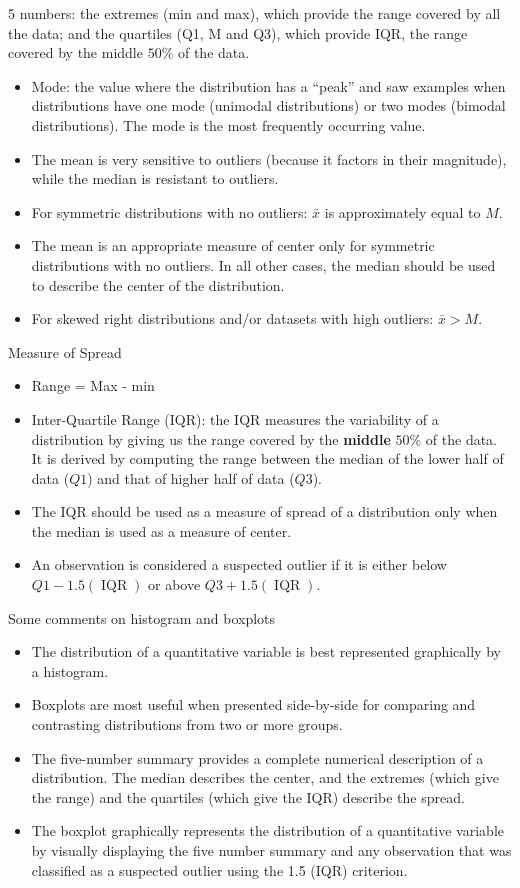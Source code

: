 \documentclass[10pt, a4paper]{article}
\begin{document}
5 numbers: the extremes (min and max), which provide the range covered by all the data; and the quartiles (Q1, M and Q3), which provide IQR, the range covered by the middle $50\%$ of the data.
\begin{itemize}
\item Mode: the value where the distribution has a “peak” and saw examples when distributions have one mode (unimodal distributions) or two modes (bimodal distributions).  The mode is the most frequently occurring value. 
\item The mean is very sensitive to outliers (because it factors in their magnitude), while the median is resistant to outliers.
\item For symmetric distributions with no outliers: $\bar{x}$ is approximately equal to $M$.
\item The mean is an appropriate measure of center only for symmetric distributions with no outliers. In all other cases, the median should be used to describe the center of the distribution.
\item For skewed right distributions and/or datasets with high outliers: $\bar{x}>M$. 
\end{itemize}
Measure of Spread
\begin{itemize}
\item Range = Max - min
\item Inter-Quartile Range (IQR): the IQR measures the variability of a distribution by giving us the range covered by the \textbf{middle} $50\%$ of the data. It is derived by computing the range between the median of the lower half of data ($Q1$) and that of higher half of data ($Q3$).
\item The IQR should be used as a measure of spread of a distribution only when the median is used as a measure of center.
\item An observation is considered a suspected outlier if it is either below $Q1 - 1.5(\operatorname{IQR})$ or above $Q3 + 1.5(\operatorname{IQR})$.
\end{itemize}
Some comments on histogram and boxplots
\begin{itemize}
\item The distribution of a quantitative variable is best represented graphically by a histogram. 
\item Boxplots are most useful when presented side-by-side for comparing and contrasting distributions from two or more groups.
\item The five-number summary provides a complete numerical description of a distribution. The median describes the center, and the extremes (which give the range) and the quartiles (which give the IQR) describe the spread.
\item  The boxplot graphically represents the distribution of a quantitative variable by visually displaying the five number summary and any observation that was classified as a suspected outlier using the 1.5 (IQR) criterion.
\end{itemize}
\end{document}
